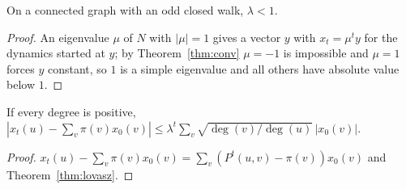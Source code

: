 \begin{lemma}\label{lem:lambda-lt-one}
\leanok{}
On a connected graph with an odd closed walk, $\lambda<1$.
\end{lemma}
\begin{proof}\leanok
An eigenvalue $\mu$ of $N$ with $|\mu|=1$ gives a vector $y$ with $x_t=\mu^ty$ for the
dynamics started at $y$; by Theorem~\ref{thm:conv} $\mu=-1$ is impossible and $\mu=1$ forces $y$
constant, so $1$ is a simple eigenvalue and all others have absolute value below $1$.
\end{proof}
\begin{corollary}\label{cor:avg-rate}
\leanok{}
If every degree is positive,
$|x_t(u)-\sum_v\pi(v)x_0(v)|\le\lambda^t\sum_v\sqrt{\deg(v)/\deg(u)}\,|x_0(v)|$.
\end{corollary}
\begin{proof}\leanok
$x_t(u)-\sum_v\pi(v)x_0(v)=\sum_v(P^t(u,v)-\pi(v))x_0(v)$ and Theorem~\ref{thm:lovasz}.
\end{proof}

